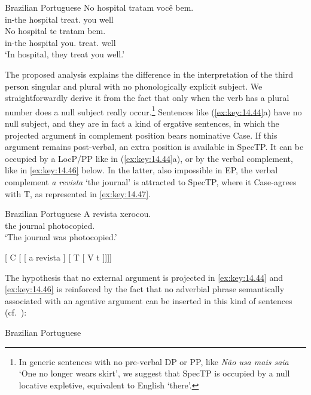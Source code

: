 \documentclass[output=paper]{langsci/langscibook}
\begin{document}
\ea\label{ex:key:14.45}Brazilian Portuguese
    \ea
	\gll    No hospital tratam você bem.\\
            in-the hospital treat.\Tpl{} you well\\
    \ex
    \gll    No hospital te tratam bem.\\
            in-the hospital you.\Acc{} treat.\Tpl{} well\\
    \glt    ‘In hospital, they treat you well.’
    \z
\z

The proposed analysis explains the difference in the interpretation of the
third person singular and plural with no phonologically explicit subject. We
straightforwardly derive it from the fact that only when the verb has a plural
number does a null subject really occur.\footnote{In generic sentences with no
pre-verbal DP or PP, like \emph{Não usa mais saia} ‘One no longer wears skirt’,
we suggest that SpecTP is occupied by a null locative expletive, equivalent to
English ‘there’.} Sentences like (\eqref{ex:key:14.44}a) have no null subject,
and they are in fact a kind of ergative sentences, in which the projected
argument in complement position bears nominative Case. If this argument remains
post-verbal, an extra position is available in SpecTP. It can be occupied by a
LocP/PP like in (\eqref{ex:key:14.44}a), or by the verbal complement, like in
\eqref{ex:key:14.46} below. In the latter, also impossible in EP, the verbal
complement \emph{a revista} ‘the journal’ is attracted to SpecTP, where it
Case-agrees with T, as represented in \eqref{ex:key:14.47}.

\ea\label{ex:key:14.46}Brazilian Portuguese
    \sn
    \gll    A revista xerocou.\\
            the journal photocopied.\Tsg{}\\
    \glt    ‘The journal was photocopied.’
\z

\ea\label{ex:key:14.47}
    {}[ C [ [ a revista ] [ T  [ V t ]]]]
\z

The hypothesis that no external argument is projected in \eqref{ex:key:14.44} and
\eqref{ex:key:14.46} is reinforced by the fact that no adverbial phrase semantically
associated with an agentive argument can be inserted in this kind of sentences
(cf.\ \citealt{Galves2000}):

\ea%
    \label{ex:key:14.48}Brazilian Portuguese
\z
\end{document}
